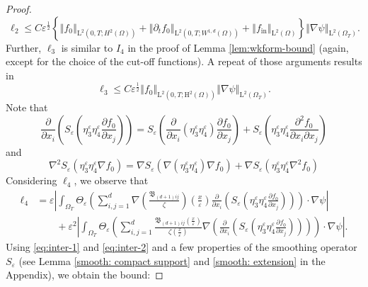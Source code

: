 \documentclass[preprint, 12pt]{amsart}
\numberwithin{equation}{section}
\numberwithin{equation}{section}
\newcommand{\xeps}{\left(\frac{x}{\varepsilon}\right)}
\newcommand{\eps}{\varepsilon}
\begin{document}
\begin{proof}
\begin{equation}
\ell_2 \le C \eps^{\frac12}\left\{
\left\Vert f_0 \right\Vert_{\mathrm L^2(0,T;H^2(\Omega))}
+ \left\Vert \partial_t f_0 \right\Vert_{\mathrm L^2(0,T;W^{1,d}(\Omega))}
+ \left\Vert  f_{\text{in}} \right\Vert_{\mathrm L^2(\Omega)}
\right\} \left\Vert \nabla \psi \right\Vert_{\mathrm L^2(\Omega_T)}.
\end{equation}
Further, $\ell_3$ is similar to $I_4$ in the proof of Lemma \ref{lem:wkform-bound} (again, except for the choice of the cut-off functions). A repeat of those arguments results in
\begin{equation}\label{eq:bd-ell-3}
\ell_3 \le C \eps^{\frac12}
\left\Vert f_0\right\Vert_{\mathrm L^2(0,T;\mathrm H^2(\Omega))}
\left\Vert \nabla \psi \right\Vert_{\mathrm L^2(\Omega_T)}.
\end{equation}
Note that
\begin{equation}\label{eq:inter-1}
\frac{\partial}{\partial x_i} \left(S_\eps \left( \eta_3^\eps \eta_4^\eps \frac{\partial f_0}{\partial x_j}\right)\right)
= S_\eps \left( \frac{\partial}{\partial x_i}\left(\eta_3^\eps \eta_4^\eps\right) \frac{\partial f_0}{\partial x_j}\right)
+ S_\eps \left( \eta_3^\eps \eta_4^\eps \frac{\partial^2 f_0}{\partial x_i \partial x_j}\right)
\end{equation}
and
\begin{equation}\label{eq:inter-2}
\nabla^2 S_\eps\left(\eta_3^\eps \eta_4^\eps \nabla f_0\right) 
= \nabla S_\eps\left(\nabla\left(\eta^\eps_3 \eta^\eps_4\right) \nabla f_0\right) 
+ \nabla S_\eps\left(\eta^\eps_3 \eta^\eps_4 \nabla^2 f_0\right)
\end{equation}
Considering $\ell_4$, we observe that
\begin{equation*}
\begin{aligned}
\ell_4 & = \eps \left\vert \int_{\Omega_T} \Theta_\eps \left(\sum_{i,j=1}^d \nabla \left(\frac{\mathfrak{B}_{(d+1)ij}}{\zeta}\right)\xeps \frac{\partial}{\partial x_i} \left(S_\eps \left( \eta_3^\eps \eta_4^\eps \frac{\partial f_0}{\partial x_j}\right)\right)\right) \cdot \nabla \psi \right\vert
\\
& \qquad + \eps^2 \left\vert \int_{\Omega_T} \Theta_\eps \left(\sum_{i,j=1}^d \frac{\mathfrak{B}_{(d+1)ij}\xeps}{\zeta\xeps} \nabla \left( \frac{\partial}{\partial x_i} \left(S_\eps \left( \eta_3^\eps \eta_4^\eps \frac{\partial f_0}{\partial x_j}\right)\right)\right)\right) \cdot \nabla \psi \right\vert.
\end{aligned}
\end{equation*}
Using \eqref{eq:inter-1} and \eqref{eq:inter-2} and a few properties of the smoothing operator $S_\eps$ (see Lemma \ref{smooth: compact support} and \ref{smooth: extension} in the Appendix), we obtain the bound:

\end{proof}
\end{document}
